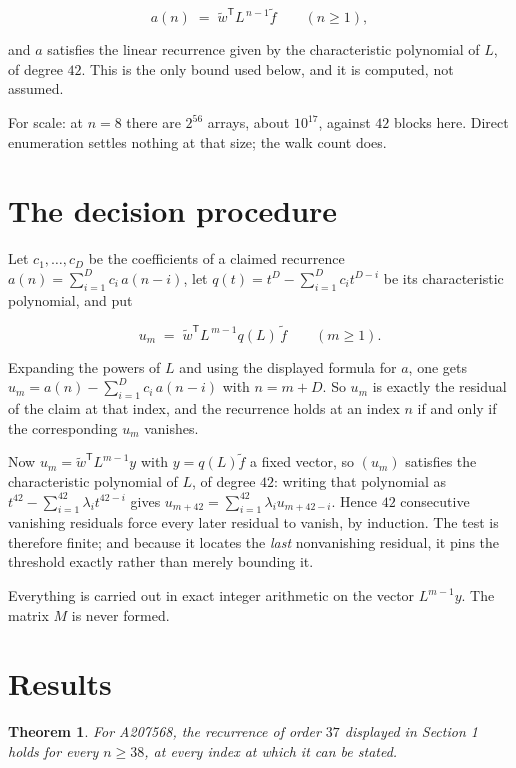 \documentclass[11pt]{article}
\newtheorem{theorem}{Theorem}
\theoremstyle{definition}
\begin{document}
\[a(n) \;=\; \tilde w^{\mathsf T} L^{\,n-1} \tilde f \qquad (n \ge 1),\]

and $a$ satisfies the linear recurrence given by the characteristic polynomial of $L$, of degree $42$. This is the only bound used below, and it is computed, not assumed.

For scale: at $n = 8$ there are $2^{56}$ arrays, about $10^{17}$, against $42$ blocks here. Direct enumeration settles nothing at that size; the walk count does.

\section{The decision procedure}

Let $c_1,\dots,c_D$ be the coefficients of a claimed recurrence $a(n) = \sum_{i=1}^{D} c_i\,a(n-i)$, let $q(t) = t^{D} - \sum_{i=1}^{D} c_i t^{D-i}$ be its characteristic polynomial, and put

\[u_m \;=\; \tilde w^{\mathsf T} L^{\,m-1} q(L)\,\tilde f \qquad (m \ge 1).\]

Expanding the powers of $L$ and using the displayed formula for $a$, one gets $u_m = a(n) - \sum_{i=1}^{D} c_i\,a(n-i)$ with $n = m + D$. So $u_m$ is exactly the residual of the claim at that index, and the recurrence holds at an index $n$ if and only if the corresponding $u_m$ vanishes.

Now $u_m = \tilde w^{\mathsf T} L^{m-1} y$ with $y = q(L)\tilde f$ a fixed vector, so $(u_m)$ satisfies the characteristic polynomial of $L$, of degree $42$: writing that polynomial as $t^{42} - \sum_{i=1}^{42} \lambda_i t^{42-i}$ gives $u_{m+42} = \sum_{i=1}^{42} \lambda_i u_{m+42-i}$. Hence $42$ consecutive vanishing residuals force every later residual to vanish, by induction. The test is therefore finite; and because it locates the {\itshape last} nonvanishing residual, it pins the threshold exactly rather than merely bounding it.

Everything is carried out in exact integer arithmetic on the vector $L^{m-1}y$. The matrix $M$ is never formed.

\section{Results}

\begin{theorem} For A207568, the recurrence of order $37$ displayed in Section 1 holds for every $n \ge 38$, at every index at which it can be stated.\end{theorem}
\end{document}
